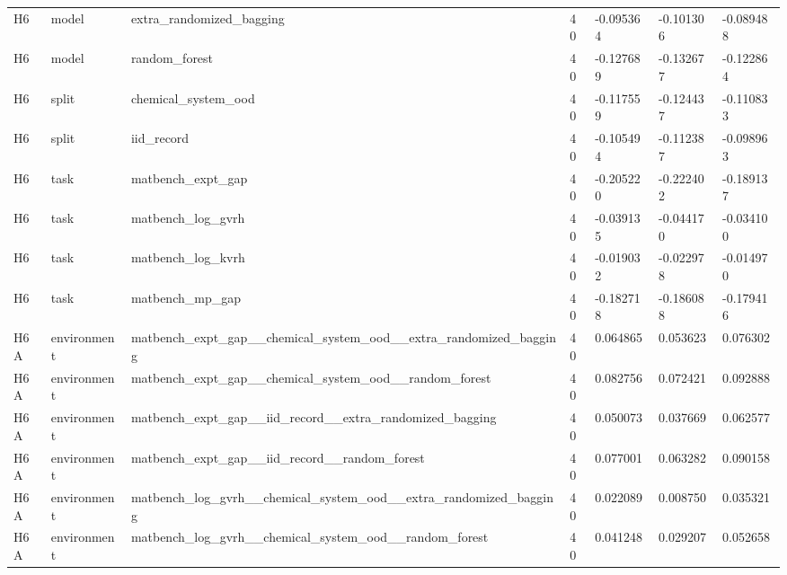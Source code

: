 \documentclass[10pt]{article}
\begin{document}
\begin{landscape}
\begin{longtable}{L{.35in}L{.6in}L{3.55in}L{.4in}L{.88in}L{.88in}L{.88in}}
H6 & model & extra\_\allowbreak{}randomized\_\allowbreak{}bagging & 40 & -0.095364 & -0.101306 & -0.089488\\
H6 & model & random\_\allowbreak{}forest & 40 & -0.127689 & -0.132677 & -0.122864\\
H6 & split & chemical\_\allowbreak{}system\_\allowbreak{}ood & 40 & -0.117559 & -0.124437 & -0.110833\\
H6 & split & iid\_\allowbreak{}record & 40 & -0.105494 & -0.112387 & -0.098963\\
H6 & task & matbench\_\allowbreak{}expt\_\allowbreak{}gap & 40 & -0.205220 & -0.222402 & -0.189137\\
H6 & task & matbench\_\allowbreak{}log\_\allowbreak{}gvrh & 40 & -0.039135 & -0.044170 & -0.034100\\
H6 & task & matbench\_\allowbreak{}log\_\allowbreak{}kvrh & 40 & -0.019032 & -0.022978 & -0.014970\\
H6 & task & matbench\_\allowbreak{}mp\_\allowbreak{}gap & 40 & -0.182718 & -0.186088 & -0.179416\\
H6A & environment & matbench\_\allowbreak{}expt\_\allowbreak{}gap\_\allowbreak{}\_\allowbreak{}chemical\_\allowbreak{}system\_\allowbreak{}ood\_\allowbreak{}\_\allowbreak{}extra\_\allowbreak{}randomized\_\allowbreak{}bagging & 40 & 0.064865 & 0.053623 & 0.076302\\
H6A & environment & matbench\_\allowbreak{}expt\_\allowbreak{}gap\_\allowbreak{}\_\allowbreak{}chemical\_\allowbreak{}system\_\allowbreak{}ood\_\allowbreak{}\_\allowbreak{}random\_\allowbreak{}forest & 40 & 0.082756 & 0.072421 & 0.092888\\
H6A & environment & matbench\_\allowbreak{}expt\_\allowbreak{}gap\_\allowbreak{}\_\allowbreak{}iid\_\allowbreak{}record\_\allowbreak{}\_\allowbreak{}extra\_\allowbreak{}randomized\_\allowbreak{}bagging & 40 & 0.050073 & 0.037669 & 0.062577\\
H6A & environment & matbench\_\allowbreak{}expt\_\allowbreak{}gap\_\allowbreak{}\_\allowbreak{}iid\_\allowbreak{}record\_\allowbreak{}\_\allowbreak{}random\_\allowbreak{}forest & 40 & 0.077001 & 0.063282 & 0.090158\\
H6A & environment & matbench\_\allowbreak{}log\_\allowbreak{}gvrh\_\allowbreak{}\_\allowbreak{}chemical\_\allowbreak{}system\_\allowbreak{}ood\_\allowbreak{}\_\allowbreak{}extra\_\allowbreak{}randomized\_\allowbreak{}bagging & 40 & 0.022089 & 0.008750 & 0.035321\\
H6A & environment & matbench\_\allowbreak{}log\_\allowbreak{}gvrh\_\allowbreak{}\_\allowbreak{}chemical\_\allowbreak{}system\_\allowbreak{}ood\_\allowbreak{}\_\allowbreak{}random\_\allowbreak{}forest & 40 & 0.041248 & 0.029207 & 0.052658\\

\end{longtable}
\end{landscape}
\end{document}
